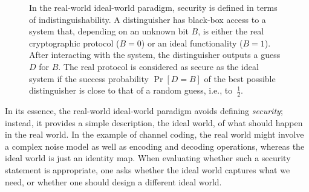 \begin{figure}[tb]
\begin{tikzpicture}


\end{tikzpicture}


\caption[Distinguishing systems]{\label{fig:distinguisher}In the real-world ideal-world paradigm, security is defined in terms of indistinguishability. A distinguisher  has black-box access to a system that, depending on an unknown bit $B$, is either the real cryptographic protocol ($B=0$) or an ideal functionality ($B=1$). After interacting with
  the system, the distinguisher outputs a guess $D$ for $B$. The real protocol is considered as secure as the ideal system if the success probability $\Pr[D=B]$ of the best possible distinguisher is close to that of a random guess, i.e., to~$\frac{1}{2}$.}
\end{figure}

In its essence, the real-world ideal-world paradigm avoids defining
\emph{security}; instead, it provides a simple description, the ideal
world, of what should happen in the real world. In the example of
channel coding, the real world might involve a complex noise model as
well as encoding and decoding operations, whereas the ideal world is
just an identity map.  When evaluating whether such a security
statement is appropriate, one asks whether the ideal world captures
what we need, or whether one should design a different ideal world.

